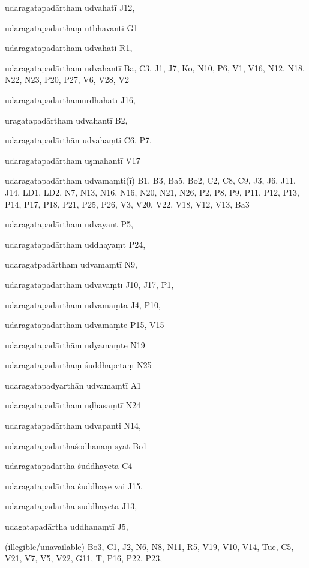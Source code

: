 \begin{ekdosis}
\begin{marma}[hp01_055]
\begin{marma}[hp02_009]
\begin{marma}[hp02_011]
\begin{marma}[hp02_25d]
\begin{description}
    \end{description}
 \end{marma}      
 
 \begin{marma}[hp02_26a]
\item[udaragatapadārtham udvahatī] J12,
\item[udaragatapadārthaṃ  utbhavanti] G1
\item[udaragatapadārtham udvahati] R1,
\item[udaragatapadārtham udvahantī] Ba, C3, J1, J7, Ko, N10, P6, V1, V16, N12, N18, N22, N23, P20, P27, V6, V28, V2
\item[udaragatapadārthamūrdhāhatī] J16,
\item[uragatapadārtham udvahantī] B2,
\item[udaragatapadārthān udvahaṃti] C6, P7, 
\item[udaragatapadārtham uşmahantī] V17
\item[udaragatapadārtham udvamaṃti(ī)] B1, B3, Ba5, Bo2, C2, C8, C9, J3, J6, J11, J14, LD1, LD2, N7, N13, N16, N16, N20, N21, N26, P2, P8, P9, P11, P12, P13, P14, P17, P18, P21, P25, P26, V3, V20, V22, V18, V12, V13, Ba3
\item[udaragatapadārtham udvayant] P5,
\item[udaragatapadārtham uddhayaṃt] P24, 
\item[udaragatpadārtham udvamaṃtī] N9,  
\item[udaragatapadārtham udvavaṃtī] J10, J17, P1,
\item[udaragatapadārtham udvamaṃta] J4, P10, 
\item[udaragatapadārtham udvamaṃte] P15, V15
\item[udaragatapadārthām udyamaṃte] N19
\item[udaragatapadārthaṃ śuddhapetaṃ] N25
\item[udaragatapadyarthān udvamaṃtī] A1
\item[udaragatapadārtham uḍhasaṃtī] N24
\item[udaragatapadārtham udvapanti] N14, 
\item[udaragatapadārthaśodhanaṃ syāt] Bo1
\item[udaragatapadārtha śuddhayeta] C4
\item[udaragatapadārtha śuddhaye vai] J15, 
\item[udaragatapadārtha suddhayeta] J13,
\item[udagatapadārtha uddhanaṃtī] J5,
\item[(illegible/unavailable)] Bo3, C1, J2, N6, N8, N11, R5, V19, V10, V14, Tue, C5, V21, V7, V5, V22, G11, T, P16, P22, P23, 
  \begin{description}
    \end{description}
 \end{marma}


\end{marma}
\end{marma}
\end{marma}
\end{ekdosis}
